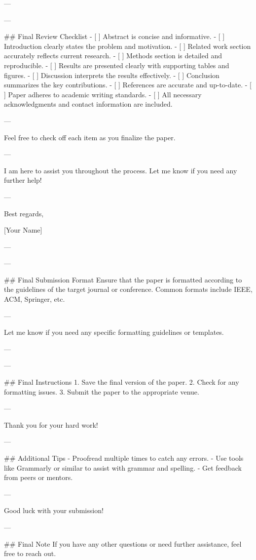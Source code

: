 --- 

---

## Final Review Checklist
- [ ] Abstract is concise and informative.
- [ ] Introduction clearly states the problem and motivation.
- [ ] Related work section accurately reflects current research.
- [ ] Methods section is detailed and reproducible.
- [ ] Results are presented clearly with supporting tables and figures.
- [ ] Discussion interprets the results effectively.
- [ ] Conclusion summarizes the key contributions.
- [ ] References are accurate and up-to-date.
- [ ] Paper adheres to academic writing standards.
- [ ] All necessary acknowledgments and contact information are included.

--- 

Feel free to check off each item as you finalize the paper. 

--- 

I am here to assist you throughout the process. Let me know if you need any further help! 

--- 

Best regards, 

[Your Name] 

--- 

---

## Final Submission Format
Ensure that the paper is formatted according to the guidelines of the target journal or conference. Common formats include IEEE, ACM, Springer, etc.

--- 

Let me know if you need any specific formatting guidelines or templates. 

--- 

---

## Final Instructions
1. Save the final version of the paper.
2. Check for any formatting issues.
3. Submit the paper to the appropriate venue.

--- 

Thank you for your hard work! 

--- 

## Additional Tips
- Proofread multiple times to catch any errors.
- Use tools like Grammarly or similar to assist with grammar and spelling.
- Get feedback from peers or mentors.

--- 

Good luck with your submission! 

--- 

## Final Note
If you have any other questions or need further assistance, feel free to reach out. 

